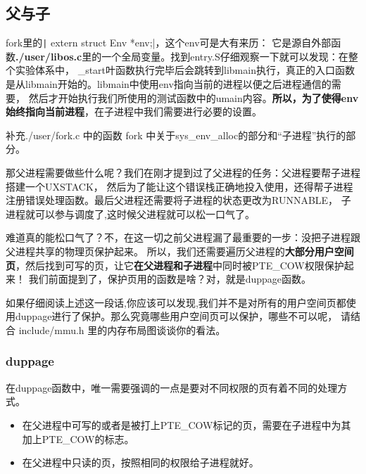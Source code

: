 \subsection{父与子}

fork里的\texttt| extern struct Env *env;|，这个env可是大有来历：
它是源自外部函数\textbf{./user/libos.c}里的一个全局变量。找到entry.S仔细观察一下就可以发现：在整个实验体系中，
\_start叶函数执行完毕后会跳转到libmain执行，真正的入口函数是从libmain开始的。libmain中使用env指向当前的进程以便之后进程通信的需要，
然后才开始执行我们所使用的测试函数中的umain内容。\textbf{所以，为了使得env始终指向当前进程}，在子进程中我们需要进行必要的设置。

\begin{exercise}
 补充./user/fork.c 中的函数 fork 中关于sys\_env\_alloc的部分和“子进程”执行的部分。
\end{exercise}

那父进程需要做些什么呢？我们在刚才提到过了父进程的任务：父进程要帮子进程搭建一个UXSTACK，
然后为了能让这个错误栈正确地投入使用，还得帮子进程注册错误处理函数。最后父进程还需要将子进程的状态更改为RUNNABLE，
子进程就可以参与调度了,这时候父进程就可以松一口气了。

难道真的能松口气了？不，在这一切之前父进程漏了最重要的一步：没把子进程跟父进程共享的物理页保护起来。
所以，我们还需要遍历父进程的\textbf{大部分用户空间页}，然后找到可写的页，让它\textbf{在父进程和子进程}中同时被PTE\_COW权限保护起来！
我们前面提到了，保护页用的函数是啥？对，就是duppage函数。

\begin{thinking}\label{think:遍历页}
	如果仔细阅读上述这一段话,你应该可以发现,我们并不是对所有的用户空间页都使用duppage进行了保护。那么究竟哪些用户空间页可以保护，哪些不可以呢，
	请结合 include/mmu.h 里的内存布局图谈谈你的看法。
\end{thinking}

\subsubsection{duppage}

在duppage函数中，唯一需要强调的一点是要对不同权限的页有着不同的处理方式。
\begin{itemize}
 \item 在父进程中可写的或者是被打上PTE\_COW标记的页，需要在子进程中为其加上PTE\_COW的标志。
 \item 在父进程中只读的页，按照相同的权限给子进程就好。
\end{itemize}


